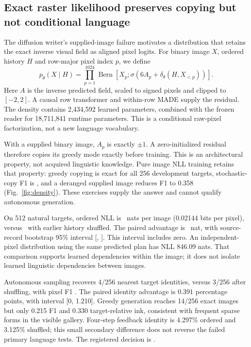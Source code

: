 \subsection*{Exact raster likelihood preserves copying but not conditional language}
The diffusion writer's supplied-image failure motivates a distribution that
retains the exact inverse visual field as aligned pixel logits. For binary
image $X$, ordered history $H$ and row-major pixel index $p$, we define
\begin{equation}
p_\theta(X\mid H)=\prod_{p=1}^{1024}
\operatorname{Bern}\!\left[X_p;\sigma(6A_p+\delta_\theta(H,X_{<p}))\right].
\end{equation}
Here $A$ is the inverse predicted field, scaled to signed pixels and clipped
to $[-2,2]$. A causal row transformer and within-row MADE supply the residual.
The density contains 2,434,592 learned parameters, combined with the frozen
reader for 18,711,841 runtime parameters. This is a conditional raw-pixel
factorization\cite{pixelrnn,pixelcnn,made}, not a new language vocabulary.

With a supplied binary image, $A_p$ is exactly $\pm1$. A zero-initialized
residual therefore copies its greedy mode exactly before training. This is an
architectural property, not acquired linguistic knowledge. Pure image NLL
training retains that property: greedy copying is exact for all 256 development
targets, stochastic-copy F1 is \DensityCopyFone, and a deranged supplied image
reduces F1 to 0.358 (Fig.~\ref{fig:density}). These exercises supply the answer
and cannot qualify autonomous generation.

On 512 natural targets, ordered NLL is \DensityNll\ nats per image
(0.02144 bits per pixel), versus \DensityShuffledNll\ with earlier history
shuffled. The paired advantage is \DensityAdvantage\ nat, with source-record
bootstrap 95\% interval [\DensityLow, \DensityHigh]. This interval includes
zero. An independent-pixel distribution using the same predicted plan has NLL
846.09 nats. That comparison supports learned dependencies within the image;
it does not isolate learned linguistic dependencies between images.

Autonomous sampling recovers 4/256 nearest target identities, versus 3/256
after shuffling, with pixel F1 \DensityFone. The paired identity advantage is
0.391 percentage points, with interval [0, 1.210]. Greedy generation reaches
14/256 exact images but only 0.215 F1 and 0.330 target-relative ink, consistent
with frequent sparse forms in the visible gallery. Four-step feedback identity
is 4.297\% ordered and 3.125\% shuffled; this small secondary difference does
not reverse the failed primary language tests. The registered decision is
\texttt{\DensityDecision}.

